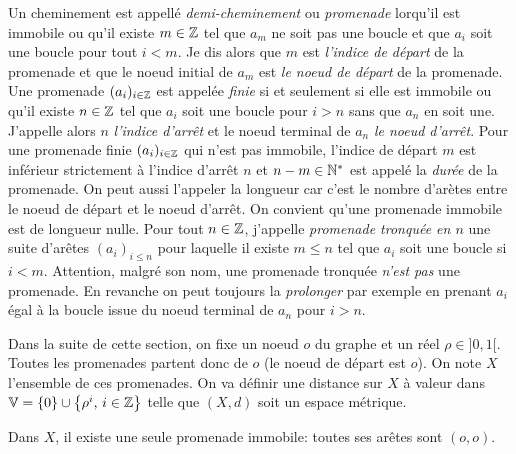  
\noindent Un cheminement est appellé \emph{demi-cheminement} ou \emph{promenade} lorqu'il est immobile ou qu'il existe $m\in\mathbb{Z}$ tel que $a_m$ ne soit pas une boucle et que $a_i$ soit une boucle pour tout $i<m$. Je dis alors que $m$ est \emph{l'indice de départ} de la promenade et que le noeud initial de $a_m$ est \emph{le noeud de départ} de la promenade.\newline
Une promenade $(a_i)_{i\in \mathbb{Z}}$ est appelée \emph{finie} si et seulement si elle est immobile ou qu'il existe $n \in \mathbb{Z}$ tel que $a_i$ soit une boucle pour $i>n$ sans que $a_n$ en soit une. J'appelle alors $n$ \emph{l'indice d'arrêt} et le noeud terminal de $a_n$ \emph{le noeud d'arrêt}.\newline
Pour une promenade finie $(a_i)_{i\in \mathbb{Z}}$ qui n'est pas immobile, l'indice de départ $m$ est inférieur strictement à l'indice d'arrêt $n$ et $n-m \in \mathbb{N}^*$ est appelé la \emph{durée} de la promenade. On peut aussi l'appeler la longueur car c'est le nombre d'arètes entre le noeud de départ et le noeud d'arrêt. On convient qu'une promenade immobile est de longueur nulle.\newline
Pour tout $n\in \mathbb{Z}$, j'appelle \emph{promenade tronquée en $n$}  une suite d'arêtes $(a_i)_{i\leq n}$ pour laquelle il existe $m\leq n$ tel que $a_i$ soit une boucle si $i<m$. Attention, malgré son nom, une promenade tronquée \emph{n'est pas} une promenade. En revanche on peut toujours la \emph{prolonger} par exemple en prenant $a_i$ égal à la boucle issue du noeud terminal de $a_n$ pour $i>n$.

Dans la suite de cette section, on fixe un noeud $o$ du graphe et un réel $\rho \in ]0,1[$. Toutes les promenades partent donc de $o$ (le noeud de départ est $o$). On note $X$ l'ensemble de ces promenades. On va définir une distance sur $X$ à valeur dans $\mathbb{V} = \{0 \}\cup \left\lbrace \rho^i,\, i \in \mathbb{Z} \right\rbrace$ telle que $(X,d)$ soit un espace métrique.
\begin{rem}
 Dans $X$, il existe une seule promenade immobile: toutes ses arêtes sont $(o,o)$.
\end{rem}

